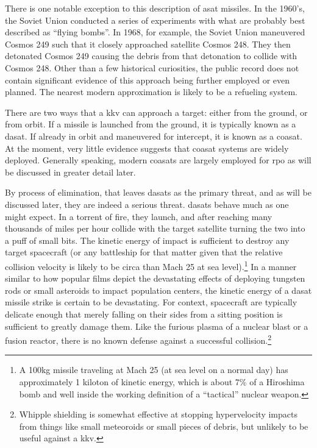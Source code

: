 There is one notable exception to this description of \ac{asat}
missiles.  In the 1960's, the Soviet Union conducted a series of
experiments with what are probably best described as ``flying
bombs''. In 1968, for example, the Soviet Union maneuvered Cosmos 249
such that it closely approached satellite Cosmos
248.\cite[p02-03]{brian} They then detonated Cosmos 249 causing the
debris from that detonation to collide with Cosmos
248.\cite[p02-03]{brian} Other than a few historical curiosities, the
public record does not contain significant evidence of this approach
being further employed or even planned.  The nearest modern
approximation is likely to be a refueling system.

There are two ways that a \ac{kkv} can approach a target: either from
the ground, or from orbit.  If a missile is launched from the ground,
it is typically known as a \acf{dasat}.  If already in orbit and
maneuvered for intercept, it is known as a \acf{coasat}.  At the
moment, very little evidence suggests that \ac{coasat} systems are
widely deployed.\cite{brian} Generally speaking, modern \acp{coasat}
are largely employed for \ac{rpo} as will be discussed in greater
detail later.

By process of elimination, that leaves \acp{dasat} as the primary
threat, and as will be discussed later, they are indeed a serious
threat.  \acp{dasat} behave much as one might expect.  In a torrent of
fire, they launch, and after reaching many thousands of miles per hour
collide with the target satellite turning the two into a puff of small
bits.\cite[p8]{kessler-reunion} The kinetic energy of impact is
sufficient to destroy any target spacecraft (or any battleship for
that matter given that the relative collision velocity is likely to be
circa than Mach 25 at sea level).\footnote{A 100kg missile traveling
at Mach 25 (at sea level on a normal day) has approximately 1 kiloton
of kinetic energy, which is about 7\% of a Hiroshima bomb and well
inside the working definition of a ``tactical'' nuclear weapon.} In a
manner similar to how popular films depict the devastating effects of
deploying tungsten rods or small asteroids to impact population
centers, the kinetic energy of a \ac{dasat} missile strike is certain
to be devastating.  For context, spacecraft are typically delicate
enough that merely falling on their sides from a sitting position is
sufficient to greatly damage them.\cite{whoopsies} Like the furious
plasma of a nuclear blast or a fusion reactor, there is no known
defense against a successful collision.\footnote{Whipple shielding is
somewhat effective at stopping hypervelocity impacts from things like
small meteoroids or small pieces of debris, but unlikely to be useful
against a \ac{kkv}.\cite{whipple-me-spacecraft}}


